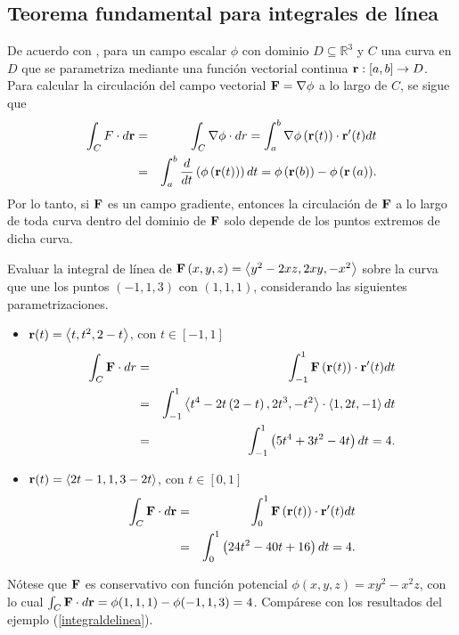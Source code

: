 \subsection{Teorema fundamental para integrales de línea}
De acuerdo con \cite{acosta_gempeler_doce_2020},
para un campo escalar $\phi$ con dominio $D \subseteq \mathbb{R}^3$ y $C$ una curva en
$D$ que se parametriza mediante una función vectorial continua ${\bf r} : [a, b]\to D$. Para calcular la circulación del campo vectorial ${\bf F}=\nabla \phi$ a lo largo de $C$, se sigue que
\begin{eqnarray*}
\int_{C}F\cdot d{\bf r}&=&\int_{C}\nabla\phi\cdot dr=\int_{a}^{b}\nabla \phi\left({\bf r}(t)\right)\cdot {\bf r}^{\prime}(t) dt\\
&=& \int_{a}^{b} \frac{d}{dt} \left(\phi \left({\bf r}(t)\right) \right) dt= \phi \left({\bf r}(b)\right) -\phi\left({\bf r}\left( a\right) \right)\!.
\end{eqnarray*}
Por lo tanto, si ${\bf F}$ es un campo gradiente, entonces la circulación de ${\bf F}$ a lo largo de toda curva dentro del dominio de ${\bf F}$ solo depende de los puntos extremos de dicha curva.

\begin{ejemplo}
Evaluar la integral de línea de {\small ${\bf F}\left( x,y,z\right) =\left\langle y^{2}-2xz,2xy,-x^{2}\right\rangle $}
sobre la curva que une los puntos $\left( -1,1,3\right) $ con $\left( 1,1,1\right)$,
considerando las siguien\-tes parametrizaciones.

\begin{itemize}
  \item ${\bf r}(t) =\left\langle t,t^{2},2-t\right\rangle $, con $t\in [-1,1]$
    \begin{eqnarray*}
      \int_{C}{\bf F}\cdot dr &=& \int_{-1}^{1}{\bf F}\left({\bf r}(t) \right) \cdot {\bf r}^{\prime }(t) dt\\
      &=& \int_{-1}^{1}\left\langle t^{4}-2t\left( 2-t\right) ,2t^{3},-t^{2}\right\rangle \cdot \left\langle 1,2t,-1\right\rangle dt \\
      &=&\int_{-1}^{1}\left(5t^{4}+3t^{2}-4t\right) dt= 4.
    \end{eqnarray*}

  \item ${\bf r}(t) =\left\langle 2t-1,1,3-2t\right\rangle $, con $t\in [0,1]$
    \begin{eqnarray*}
      \int_{C}{\bf F}\cdot d{\bf r}&=&\int_{0}^{1}{\bf F}\left({\bf r}(t) \right) \cdot{\bf r}^{\prime }(t) dt \\
      &=& \int_{0}^{1}\left( 24t^{2}-40t+16\right)dt= 4.
    \end{eqnarray*}
\end{itemize}

Nótese que ${\bf F}$ es conservativo con función potencial $\phi(x,y,z)=xy^2-x^2z$, con lo cual
$\int_{C}{\bf F}\cdot d{\bf r}= \phi(1,1,1)-\phi(-1,1,3)=4$.
Compárese con los resultados del ejemplo (\ref{integraldelinea}).
\end{ejemplo}

